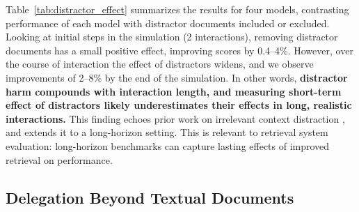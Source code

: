 \documentclass{article} %
\begin{document}
Table~\ref{tab:distractor_effect} summarizes the results for four models, contrasting performance of each model with distractor documents included or excluded. Looking at initial steps in the simulation (2 interactions), removing distractor documents has a small positive effect, improving scores by 0.4--4\%. However, over the course of interaction the effect of distractors widens, and we observe improvements of 2--8\% by the end of the simulation. In other words, \textbf{distractor harm compounds with interaction length, and measuring short-term effect of distractors likely underestimates their effects in long, realistic interactions.} This finding echoes prior work on irrelevant context distraction \citep{Shi2023LargeLM}, and extends it to a long-horizon setting. This is relevant to retrieval system evaluation: long-horizon benchmarks can capture lasting effects of improved retrieval on performance.


\subsection{Delegation Beyond Textual Documents} \label{sec:image_domain}

\begin{table}[t]
\vspace{-2\intextsep}
\begin{minipage}[t]{0.48\textwidth}
\vspace{0pt}
\centering

\caption{Distractor effect on degradation, with distractor (top) and without (indented). Removing distractors consistently improves scores across all models and rounds.}
\label{tab:distractor_effect}
\end{minipage}\hfill
\begin{minipage}[t]{0.48\textwidth}
\vspace{0pt}
\centering

\caption{Image editing relay results for nine image generation models. Current models degrade images significantly faster than LLMs degrade text.}
\label{tab:image_domain}
\end{minipage}
\vspace{-1\intextsep}
\end{table}
\end{document}
